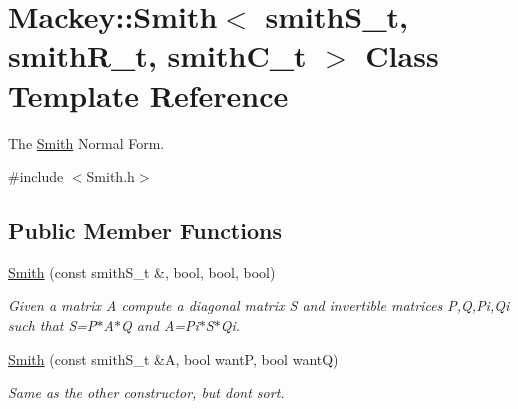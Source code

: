 \hypertarget{classMackey_1_1Smith}{}\section{Mackey\+:\+:Smith$<$ smith\+S\+\_\+t, smith\+R\+\_\+t, smith\+C\+\_\+t $>$ Class Template Reference}
\label{classMackey_1_1Smith}


The \hyperlink{classMackey_1_1Smith}{Smith} Normal Form.  




{\ttfamily \#include $<$Smith.\+h$>$}

\subsection*{Public Member Functions}
\begin{DoxyCompactItemize}
\item 
\hyperlink{classMackey_1_1Smith_a534aaf0e0b2da7d312d80ad7d67ae794}{Smith} (const smith\+S\+\_\+t \&, bool, bool, bool)
\begin{DoxyCompactList}\small\item\em Given a matrix A compute a diagonal matrix S and invertible matrices P,Q,Pi,Qi such that S=P$\ast$\+A$\ast$Q and A=Pi$\ast$\+S$\ast$\+Qi. \end{DoxyCompactList}\item 
\hyperlink{classMackey_1_1Smith_a207e1221d2d15f9d9ab4ef36be67eb85}{Smith} (const smith\+S\+\_\+t \&A, bool wantP, bool wantQ)
\begin{DoxyCompactList}\small\item\em Same as the other constructor, but don\textquotesingle{}t sort. \end{DoxyCompactList}\end{DoxyCompactItemize}
